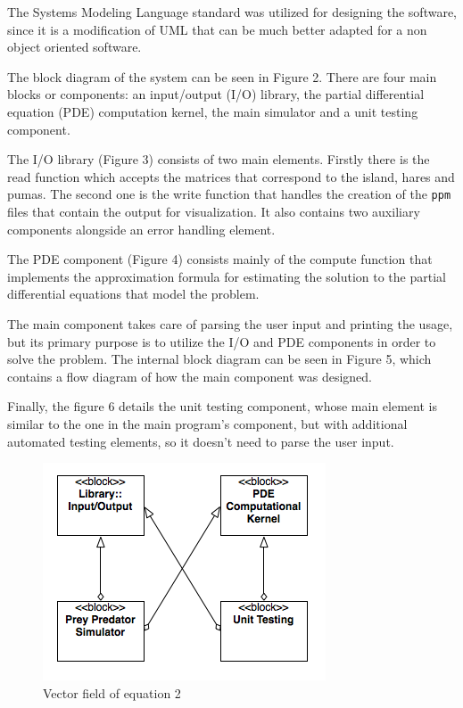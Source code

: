 \documentclass[12pt,a4paper]{article}
\begin{document}
The Systems Modeling Language standard was utilized for designing the software, since it is a modification of UML that can be much better adapted for a non object oriented software. 

The block diagram of the system can be seen in Figure 2. There are four main blocks or components: an input/output (I/O) library, the partial differential equation (PDE) computation kernel, the main simulator and a unit testing component.

The I/O library (Figure 3) consists of two main elements. Firstly there is the read function which accepts the matrices that correspond to the island, hares and pumas. The second one is the write function that handles the creation of the \texttt{ppm} files that contain the output for visualization. It also contains two auxiliary components alongside an error handling element.

The PDE component (Figure 4) consists mainly of the compute function that implements the approximation formula for estimating the solution to the partial differential equations that model the problem.

The main component takes care of parsing the user input and printing the usage, but its primary purpose is to utilize the I/O and PDE components in order to solve the problem. The internal block diagram can be seen in Figure 5, which contains a flow diagram of how the main component was designed.

Finally, the figure 6 details the unit testing component, whose main element is similar to the one in the main program's component, but with additional automated testing elements, so it doesn't need to parse the user input.


\begin{figure}[hb]
    \centering
    \includegraphics[scale=0.6]{images/blockdesign.png}
    \caption{Vector field of equation 2}
\end{figure}
\end{document}

